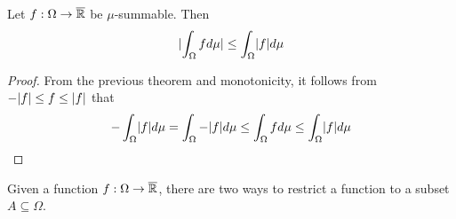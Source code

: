 \begin{cor}
Let $f: \Omega \to \overline{\mathbb{R}}$ be $\mu$-summable. Then
\begin{align*}
  \abs{\int_{\Omega} f d \mu} \leq \int_{\Omega} \abs{f} d \mu
\end{align*}
\end{cor}
\begin{proof}
  From the previous theorem and monotonicity, it follows from $- \vert f\vert \leq f \leq \vert f\vert$ that
  \begin{align*}
    - \int_{\Omega} \abs{f} d \mu = \int_{\Omega} - \abs{f} d \mu \leq \int_{\Omega} f d \mu \leq \int_{\Omega} \abs{f} d \mu
  \end{align*}
\end{proof}


Given a function $f: \Omega \to \overline{\mathbb{R}}$, there are two ways to restrict a function to a subset $A \subseteq \Omega$.


